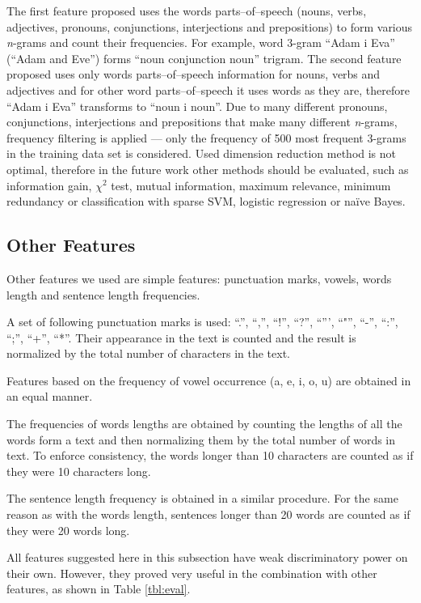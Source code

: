 \documentclass{llncs}
\begin{document}
The first feature proposed uses the words parts--of--speech
(nouns, verbs, adjectives, pronouns, conjunctions, interjections and
prepositions) to form various \emph{n}-grams and count their frequencies. For
example, word 3-gram ``Adam i Eva'' (``Adam and Eve'') forms ``noun
conjunction noun'' trigram. The second feature proposed uses only words
parts--of--speech information for nouns, verbs and adjectives and for other word
parts--of--speech it uses words as they are, therefore ``Adam i Eva'' transforms
to ``noun i noun''. Due to many different pronouns, conjunctions, interjections
and prepositions that make many different \emph{n}-grams, frequency filtering
is applied --- only the frequency of 500 most frequent 3-grams in the
training data set is considered. Used dimension reduction method is not optimal,
therefore in the future work other methods should be evaluated, such as information
gain, $\chi^2$ test, mutual information, maximum relevance, minimum redundancy
or classification with sparse SVM, logistic regression or na\"ive Bayes.

\subsection{Other Features}
\label{sec:znacajke-manje}
Other features we used are simple features: punctuation marks, vowels, words
length and sentence length frequencies.

A set of following punctuation marks is used: ``.'', ``,'', ``!'', ``?'',
``''', ``"'', ``-'', ``:'', ``;'', ``+'', ``*''. Their appearance in the text is counted and
the result is normalized by the total number of characters in the text. 

Features based on the frequency of vowel occurrence (a, e, i, o, u) are
obtained in an equal manner.

The frequencies of words lengths are obtained by counting the lengths of all
the words form a text and then normalizing them by the total number of words in
text. To enforce consistency, the words longer than 10 characters are counted as
if they were 10 characters long.

The sentence length frequency is obtained in a similar procedure.
For the same reason as with the words length, sentences longer than 20 words are
counted as if they were 20 words long.

All features suggested here in this subsection have weak discriminatory power
on their own. However, they proved very useful in the combination with other features, as
shown in Table \ref{tbl:eval}.
\end{document}
